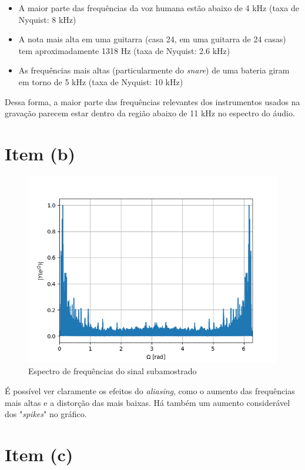 \documentclass{article}
\begin{document}
\begin{itemize}
    \item A maior parte das frequências da voz humana estão abaixo de 4 kHz (taxa de Nyquist: 8 kHz)
    \item A nota mais alta em uma guitarra (casa 24, em uma guitarra de 24 casas) tem aproximadamente 1318 Hz (taxa de Nyquist: 2.6 kHz)
    \item As frequências mais altas (particularmente do \textit{snare}) de uma bateria giram em torno de 5 kHz (taxa de Nyquist: 10 kHz)
\end{itemize}

Dessa forma, a maior parte das frequências relevantes dos instrumentos usados na gravação parecem estar dentro da região abaixo de 11 kHz no espectro do áudio.

\newpage
\section*{Item (b)}
\begin{figure}[!ht]
    \centering
    \includegraphics[width=\linewidth]{images/downsampled_spectrum.png}
    \caption{Espectro de frequências do sinal subamostrado}
\end{figure}

É possível ver claramente os efeitos do \textit{aliasing}, como o aumento das frequências mais altas e a distorção das mais baixas. Há também um aumento considerável dos "\textit{spikes}" no gráfico.

\section*{Item (c)}
\end{document}
